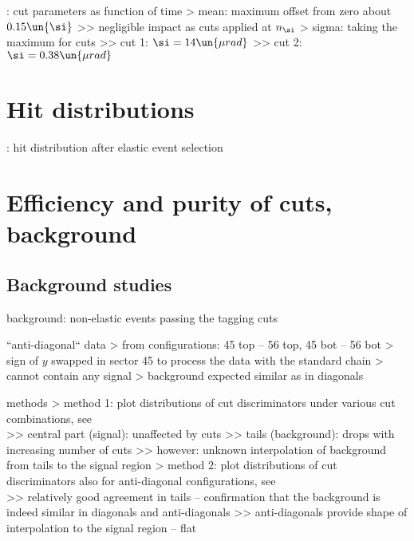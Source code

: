 \>  : cut parameters as function of time
\>> mean: maximum offset from zero about $0.15\un{\si}$
\>>> negligible impact as cuts applied at $n_\si$
\>> sigma: taking the maximum for cuts
\>>> cut 1: $\si = 14\un{\mu rad}$
\>>> cut 2: $\si = 0.38\un{\mu rad}$



\chapter{Hit distributions}

\> : hit distribution after elastic event selection



\chapter{Efficiency and purity of cuts, background}

\section{Background studies}

\> background: non-elastic events passing the tagging cuts

\> ``anti-diagonal`` data
\>> from configurations: 45 top -- 56 top, 45 bot -- 56 bot
\>> sign of $y$ swapped in sector 45 to process the data with the standard chain
\>> cannot contain any signal
\>> background expected similar as in diagonals

\> methods
\>> method 1: plot distributions of cut discriminators under various cut combinations, see\\ 
\>>> central part (signal): unaffected by cuts
\>>> tails (background): drops with increasing number of cuts
\>>> however: unknown interpolation of background from tails to the signal region
\>> method 2: plot distributions of cut discriminators also for anti-diagonal configurations, see\\ 
\>>> relatively good agreement in tails -- confirmation that the background is indeed similar in diagonals and anti-diagonals
\>>> anti-diagonals provide shape of interpolation to the signal region -- flat

